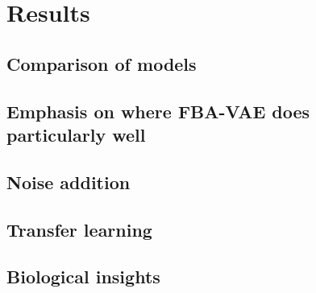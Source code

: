\chapter{Results}\label{chap:res}

\section{Comparison of models}

\section{Emphasis on where FBA-VAE does particularly well}

\section{Noise addition}

\section{Transfer learning}

\section{Biological insights}